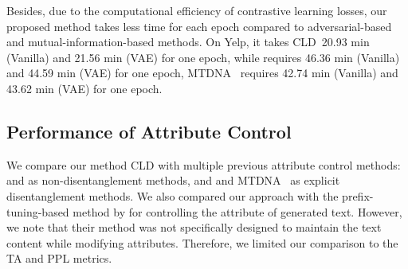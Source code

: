 \documentclass[11pt,a4paper]{article}
\newcommand{\Mname}{CLD}
\renewcommand{\cite}{\citep}
\begin{document}
Besides, due to the computational efficiency of contrastive learning losses, our proposed method takes less time for each epoch  compared to adversarial-based  and mutual-information-based methods.  On Yelp, it takes \Mname\ 20.93 min (Vanilla) and 21.56 min (VAE) for one epoch, while \cite{john-etal-2019-disentangled} requires 46.36 min (Vanilla) and 44.59 min (VAE) for one epoch, MTDNA~\cite{sha2021multi} requires 42.74 min (Vanilla) and 43.62 min (VAE) for one epoch. 



\subsection{Performance of Attribute Control}
We compare our method CLD with multiple previous attribute  control methods:  \cite{logeswaran2018content} and \cite{lample2019multipleattribute} as non-disentanglement methods, and  \cite{john-etal-2019-disentangled}   and MTDNA~\cite{sha2021multi} as explicit disentanglement methods. 
We also compared our approach with the prefix-tuning-based method by  for controlling the attribute of generated text. However, we note that their method was not specifically designed to maintain the text content while modifying attributes. Therefore, we limited our comparison to the TA and PPL metrics.

\end{document}
